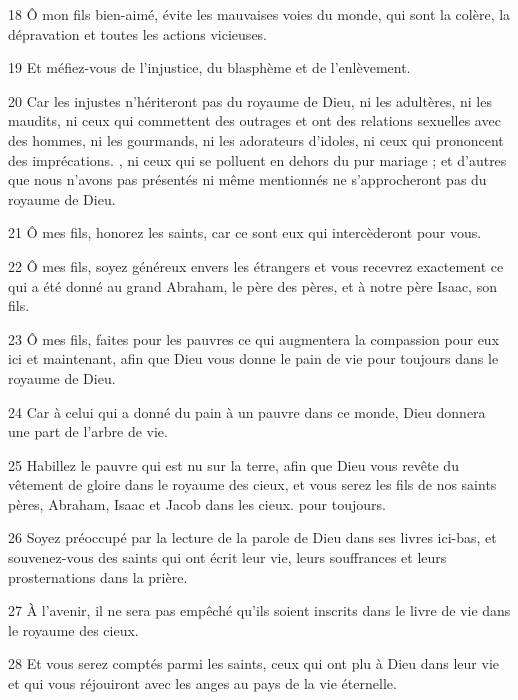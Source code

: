 \par 18 Ô mon fils bien-aimé, évite les mauvaises voies du monde, qui sont la colère, la dépravation et toutes les actions vicieuses.

\par 19 Et méfiez-vous de l'injustice, du blasphème et de l'enlèvement.

\par 20 Car les injustes n'hériteront pas du royaume de Dieu, ni les adultères, ni les maudits, ni ceux qui commettent des outrages et ont des relations sexuelles avec des hommes, ni les gourmands, ni les adorateurs d'idoles, ni ceux qui prononcent des imprécations. , ni ceux qui se polluent en dehors du pur mariage ; et d'autres que nous n'avons pas présentés ni même mentionnés ne s'approcheront pas du royaume de Dieu.

\par 21 Ô mes fils, honorez les saints, car ce sont eux qui intercèderont pour vous.

\par 22 Ô mes fils, soyez généreux envers les étrangers et vous recevrez exactement ce qui a été donné au grand Abraham, le père des pères, et à notre père Isaac, son fils.

\par 23 Ô mes fils, faites pour les pauvres ce qui augmentera la compassion pour eux ici et maintenant, afin que Dieu vous donne le pain de vie pour toujours dans le royaume de Dieu.

\par 24 Car à celui qui a donné du pain à un pauvre dans ce monde, Dieu donnera une part de l'arbre de vie.

\par 25 Habillez le pauvre qui est nu sur la terre, afin que Dieu vous revête du vêtement de gloire dans le royaume des cieux, et vous serez les fils de nos saints pères, Abraham, Isaac et Jacob dans les cieux. pour toujours.

\par 26 Soyez préoccupé par la lecture de la parole de Dieu dans ses livres ici-bas, et souvenez-vous des saints qui ont écrit leur vie, leurs souffrances et leurs prosternations dans la prière.

\par 27 À l'avenir, il ne sera pas empêché qu'ils soient inscrits dans le livre de vie dans le royaume des cieux.

\par 28 Et vous serez comptés parmi les saints, ceux qui ont plu à Dieu dans leur vie et qui vous réjouiront avec les anges au pays de la vie éternelle.

